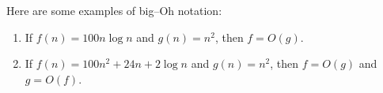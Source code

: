 \begin{example}
    Here are some examples of big--Oh notation:
    \begin{enumerate}[itemsep=5pt,parsep=5pt,leftmargin=3em,topsep=5pt,label=(\arabic*)] %
        \item 
        If $f(n)=100n\log n$ and $g(n)=n^2$, 
        then $f = O(g)$.

        \item 
        If $f(n) = 100n^2 + 24n + 2\log n$ and $g(n)=n^2$, 
        then $f=O(g)$ and $g=O(f)$.
    \end{enumerate}
\end{example}



